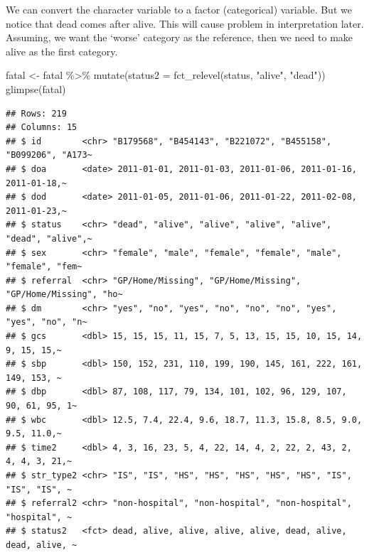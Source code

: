 \documentclass[
]{book}
\makeatletter
\newenvironment{Shaded}{\begin{snugshade}}{\end{snugshade}}
\newcommand{\AttributeTok}[1]{\textcolor[rgb]{0.61,0.61,0.61}{#1}}
\newcommand{\FunctionTok}[1]{\textcolor[rgb]{0,0,0}{#1}}
\newcommand{\NormalTok}[1]{#1}
\newcommand{\OtherTok}[1]{\textcolor[rgb]{0.37,0.37,0.37}{#1}}
\newcommand{\SpecialCharTok}[1]{\textcolor[rgb]{0,0,0}{#1}}
\newcommand{\StringTok}[1]{\textcolor[rgb]{0.5,0.5,0.5}{#1}}
\newenvironment{kframe}{%
\medskip{}
\setlength{\fboxsep}{.8em}
 \def\at@end@of@kframe{}%
 \ifinner\ifhmode%
  \def\at@end@of@kframe{\end{minipage}}%
  \begin{minipage}{\columnwidth}%
 \fi\fi%
 \def\FrameCommand##1{\hskip\@totalleftmargin \hskip-\fboxsep
 \colorbox{shadecolor}{##1}\hskip-\fboxsep
     \hskip-\linewidth \hskip-\@totalleftmargin \hskip\columnwidth}%
 \MakeFramed {\advance\hsize-\width
   \@totalleftmargin\z@ \linewidth\hsize
   \@setminipage}}%
 {\par\unskip\endMakeFramed%
 \at@end@of@kframe}
\renewenvironment{Shaded}{\begin{kframe}}{\end{kframe}}
\makeatother
\begin{document}
We can convert the character variable to a factor (categorical) variable. But we notice that dead comes after alive. This will cause problem in interpretation later. Assuming, we want the `worse' category as the reference, then we need to make alive as the first category.

\begin{Shaded}
\begin{Highlighting}[]
\NormalTok{fatal }\OtherTok{\textless{}{-}}\NormalTok{ fatal }\SpecialCharTok{\%\textgreater{}\%} \FunctionTok{mutate}\NormalTok{(}\AttributeTok{status2 =} \FunctionTok{fct\_relevel}\NormalTok{(status, }\StringTok{"alive"}\NormalTok{, }\StringTok{"dead"}\NormalTok{)) }
\FunctionTok{glimpse}\NormalTok{(fatal)}
\end{Highlighting}
\end{Shaded}

\begin{verbatim}
## Rows: 219
## Columns: 15
## $ id        <chr> "B179568", "B454143", "B221072", "B455158", "B099206", "A173~
## $ doa       <date> 2011-01-01, 2011-01-03, 2011-01-06, 2011-01-16, 2011-01-18,~
## $ dod       <date> 2011-01-05, 2011-01-06, 2011-01-22, 2011-02-08, 2011-01-23,~
## $ status    <chr> "dead", "alive", "alive", "alive", "alive", "dead", "alive",~
## $ sex       <chr> "female", "male", "female", "female", "male", "female", "fem~
## $ referral  <chr> "GP/Home/Missing", "GP/Home/Missing", "GP/Home/Missing", "ho~
## $ dm        <chr> "yes", "no", "yes", "no", "no", "no", "yes", "yes", "no", "n~
## $ gcs       <dbl> 15, 15, 15, 11, 15, 7, 5, 13, 15, 15, 10, 15, 14, 9, 15, 15,~
## $ sbp       <dbl> 150, 152, 231, 110, 199, 190, 145, 161, 222, 161, 149, 153, ~
## $ dbp       <dbl> 87, 108, 117, 79, 134, 101, 102, 96, 129, 107, 90, 61, 95, 1~
## $ wbc       <dbl> 12.5, 7.4, 22.4, 9.6, 18.7, 11.3, 15.8, 8.5, 9.0, 9.5, 11.0,~
## $ time2     <dbl> 4, 3, 16, 23, 5, 4, 22, 14, 4, 2, 22, 2, 43, 2, 4, 4, 3, 21,~
## $ str_type2 <chr> "IS", "IS", "HS", "HS", "HS", "HS", "HS", "IS", "IS", "IS", ~
## $ referral2 <chr> "non-hospital", "non-hospital", "non-hospital", "hospital", ~
## $ status2   <fct> dead, alive, alive, alive, alive, dead, alive, dead, alive, ~
\end{verbatim}

\begin{Shaded}
\end{Shaded}
\end{document}
